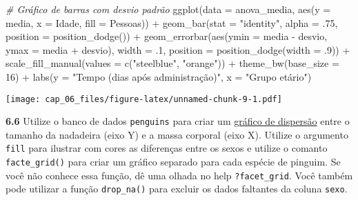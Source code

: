 \documentclass[
]{book}
\newenvironment{Shaded}{\begin{snugshade}}{\end{snugshade}}
\newcommand{\AttributeTok}[1]{\textcolor[rgb]{0.77,0.63,0.00}{#1}}
\newcommand{\CommentTok}[1]{\textcolor[rgb]{0.56,0.35,0.01}{\textit{#1}}}
\newcommand{\DecValTok}[1]{\textcolor[rgb]{0.00,0.00,0.81}{#1}}
\newcommand{\FunctionTok}[1]{\textcolor[rgb]{0.00,0.00,0.00}{#1}}
\newcommand{\NormalTok}[1]{#1}
\newcommand{\SpecialCharTok}[1]{\textcolor[rgb]{0.00,0.00,0.00}{#1}}
\newcommand{\StringTok}[1]{\textcolor[rgb]{0.31,0.60,0.02}{#1}}
\begin{document}
\begin{Shaded}
\begin{Highlighting}[]
\CommentTok{\# Gráfico de barras com desvio padrão}
\FunctionTok{ggplot}\NormalTok{(}\AttributeTok{data =}\NormalTok{ anova\_media, }\FunctionTok{aes}\NormalTok{(}\AttributeTok{y =}\NormalTok{ media, }\AttributeTok{x =}\NormalTok{ Idade, }\AttributeTok{fill =}\NormalTok{ Pessoas)) }\SpecialCharTok{+}
    \FunctionTok{geom\_bar}\NormalTok{(}\AttributeTok{stat =} \StringTok{"identity"}\NormalTok{, }\AttributeTok{alpha =}\NormalTok{ .}\DecValTok{75}\NormalTok{, }\AttributeTok{position =} \FunctionTok{position\_dodge}\NormalTok{()) }\SpecialCharTok{+}
    \FunctionTok{geom\_errorbar}\NormalTok{(}\FunctionTok{aes}\NormalTok{(}\AttributeTok{ymin =}\NormalTok{ media }\SpecialCharTok{{-}}\NormalTok{ desvio, }\AttributeTok{ymax =}\NormalTok{ media }\SpecialCharTok{+}\NormalTok{ desvio), }
                  \AttributeTok{width =}\NormalTok{ .}\DecValTok{1}\NormalTok{, }\AttributeTok{position =} \FunctionTok{position\_dodge}\NormalTok{(}\AttributeTok{width =}\NormalTok{ .}\DecValTok{9}\NormalTok{)) }\SpecialCharTok{+}
  \FunctionTok{scale\_fill\_manual}\NormalTok{(}\AttributeTok{values =} \FunctionTok{c}\NormalTok{(}\StringTok{"steelblue"}\NormalTok{, }\StringTok{"orange"}\NormalTok{)) }\SpecialCharTok{+}
  \FunctionTok{theme\_bw}\NormalTok{(}\AttributeTok{base\_size =} \DecValTok{16}\NormalTok{) }\SpecialCharTok{+}
  \FunctionTok{labs}\NormalTok{(}\AttributeTok{y =} \StringTok{"Tempo (dias após administração)"}\NormalTok{,}
       \AttributeTok{x =} \StringTok{"Grupo etário"}\NormalTok{)}
\end{Highlighting}
\end{Shaded}

\texttt{[image: cap\_06\_files/figure-latex/unnamed-chunk-9-1.pdf]}

\textbf{6.6}
Utilize o banco de dados \texttt{penguins} para criar um \href{https://analises-ecologicas.netlify.app/cap6.html\#gr\%C3\%A1fico-de-dispers\%C3\%A3o-scatter-plot}{gráfico de dispersão} entre o tamanho da nadadeira (eixo Y) e a massa corporal (eixo X). Utilize o argumento \texttt{fill} para ilustrar com cores as diferenças entre os sexos e utilize o comanto \texttt{facte\_grid()} para criar um gráfico separado para cada espécie de pinguim. Se você não conhece essa função, dê uma olhada no help \texttt{?facet\_grid}. Você também pode utilizar a função \texttt{drop\_na()} para excluir os dados faltantes da coluna \texttt{sexo}.
\end{document}
